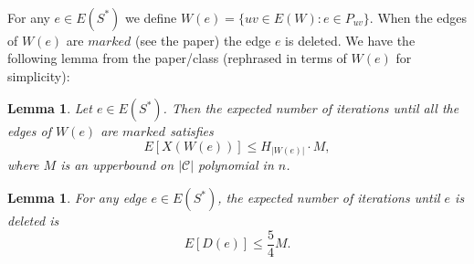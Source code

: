\documentclass[letterpaper,12pt,oneside,onecolumn]{article}
\newcommand{\cC}{\mathcal{C}} \newcommand{\cD}{\mathcal{D}}
\newtheorem{lemma}[fact]{Lemma}
\begin{document}
\paragraph{}
For any $e \in E(S^*)$ we define $W(e) = \{ uv \in E(W): e \in P_{uv}\}$. When the edges of $W(e)$ are $\textit{marked}$ (see the paper) the edge $e$ is deleted. We have the following lemma from the paper/class (rephrased in terms of $W(e)$ for simplicity):
\begin{lemma}\label{lemma:20}
Let $e \in E(S^*)$. Then the expected number of iterations until all the edges of $W(e)$ are $\textit{marked}$ satisfies $$E[X(W(e))] \leq H_{|W(e)|} \cdot M,$$
where $M$ is an upperbound on $|\cC|$ polynomial in $n$.
\end{lemma}
\begin{lemma}\label{lemma:de}
For any edge $e \in E(S^*)$, the expected number of iterations until $e$ is deleted is
$$E[D(e)] \leq \frac{5}{4} M.$$
\end{lemma}
\end{document}
